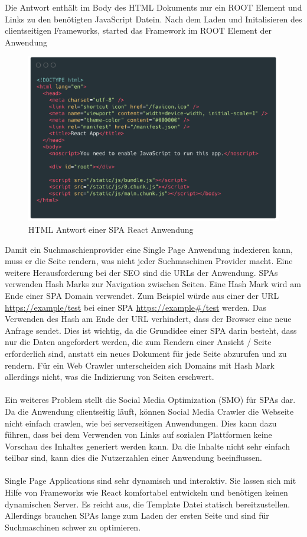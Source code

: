 \documentclass[runningheads]{llncs}
\begin{document}
Die Antwort enthält im Body des HTML Dokuments nur ein ROOT Element und Links zu
den benötigten JavaScript Datein. Nach dem Laden und Initalisieren des clientseitigen Frameworks,
started das Framework im ROOT Element der Anwendung
\begin{figure}[h]
  \centering
  \includegraphics[width=12cm]{images/react-code-small}
  \caption{HTML Antwort einer SPA React Anwendung}
  \label{HTML Antwort einer SPA React Anwendung}
\end{figure}

Damit ein Suchmaschienprovider eine Single Page Anwendung indexieren kann,
muss er die Seite rendern,
was nicht jeder Suchmaschinen Provider macht. 
Eine weitere Herausforderung bei der SEO sind die URLs der Anwendung. 
SPAs verwenden Hash Marks zur Navigation zwischen Seiten. 
Eine Hash Mark wird am Ende einer SPA Domain verwendet. 
Zum Beispiel würde aus einer der URL \url{https://example/test} bei einer SPA 
\url{https://example#/test} werden. 
Das Verwenden des Hash am Ende der URL verhindert, 
dass der Browser eine neue Anfrage sendet. 
Dies ist wichtig, da die Grundidee einer SPA darin besteht, 
dass nur die Daten angefordert werden, 
die zum Rendern einer Ansicht / Seite erforderlich sind, 
anstatt ein neues Dokument für jede Seite abzurufen und zu rendern. 
Für ein Web Crawler unterscheiden sich Domains mit Hash Mark allerdings 
nicht, was die Indizierung von Seiten erschwert.
\\
\\
Ein weiteres Problem stellt die Social Media Optimization (SMO) für SPAs dar. 
Da die Anwendung clientseitig läuft, 
können Social Media Crawler die Webseite nicht einfach crawlen, 
wie bei serverseitigen Anwendungen. Dies kann dazu führen, 
dass bei dem Verwenden von Links auf sozialen Plattformen 
keine Vorschau des Inhaltes generiert werden kann. 
Da die Inhalte nicht sehr einfach teilbar sind, 
kann dies die  Nutzerzahlen einer Anwendung beeinflussen.
\\
\\
Single Page Applications sind sehr dynamisch und interaktiv. 
Sie lassen sich mit Hilfe von Frameworks wie React komfortabel entwickeln
und benötigen keinen dynamischen Server. Es reicht aus, 
die Template Datei statisch bereitzustellen. 
Allerdings brauchen SPAs lange zum Laden der ersten Seite
und sind für Suchmaschinen schwer zu optimieren. 
\newpage
\end{document}
